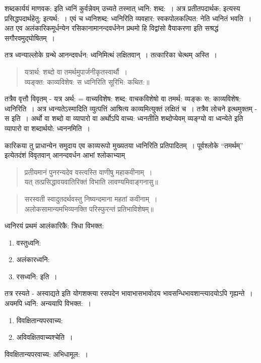 {शब्दकार्ययं माणवक: इति ध्वनिं कुर्वन्नेवम् उच्यते तस्मात् ध्वनि: शब्द:~। अत्र प्रतीतपदार्थक: इत्यस्य प्रसिद्धपदार्थहेतु: इत्यर्थ:~। एवं च ध्वनिशब्द: ध्वनिरिति व्यवहार: स्वकपोलकल्पित: नेति ध्वनितं भवति~। अत एव अलंकारिकमूर्धन्येन रसिकानामानन्दवर्धनेन प्रथमो हि विद्वांसो वैयाकरणा इति सश्रद्धं सगौरवमुद्घोषितम्~। 

तत्र ध्वन्याल्लोके ग्रन्थे आनन्दवर्धन: ध्वनिमित्थं लक्षितवान्~। तत्कारिका चेत्थम् अस्ति~। 
\begin{verse}
यत्रार्थ: शब्दो वा तमर्थमुपार्जनीकृतस्वार्थौ~। \\
व्यङ्क्त: काव्यविशेष: स ध्वनिरिति सूरिभि: कथित:॥
\end{verse}
तत्रैव वृत्तौ विवृतम् - यत्र अर्थ: = वाच्यविशेष: शब्द: वाचकविशेषो वा तमर्थ: व्यङ्कः स: काव्यविशेष: ध्वनिरिति~। अत्र ध्वन्यतेऽस्मादिति व्युत्पत्तिं आश्रित्य काव्यमित्युक्तं लक्षितं च~। तत्रैव लोचने इत्थमुक्तम् - स इति~। अर्थो वा शब्दो वा व्यापारो वा अर्थोऽपि वाच्य: ध्वनतीति शब्दोप्येवम् व्यङ्ग्यो वा ध्वन्येते इति व्यापारो वा शब्दार्थयो: ध्वननमिति~। 

कारिकया तु प्राधान्येन समुदाय एव काव्यरूपो मुख्यतया ध्वनिरिति प्रतिपादितम्~। पूर्वश्लोके “तमर्थम्” इत्येतदंशं विवृतवान् आनन्दवर्धन आभां श्लोकाभ्याम् 
\begin{verse}
प्रतीयमानं पुनरन्यदेव वस्त्वस्ति वाणीषु महाकवीनाम्~। \\
यत् तत्प्रसिद्धावयवातिरिक्तं विभाति लावण्यमिवाङ्गनासु॥
\end{verse}
\begin{verse}
सरस्वती स्वादुतदर्थवस्तु निष्यन्दमाना महतां कवीनाम्~। \\
अलोकसामान्यमभिव्यनक्ति परिस्फुरन्तं प्रतिभाविशेषम्॥
\end{verse}
ध्वनिरयं प्रथमं आलंकारिकै: त्रिधा विभक्त:
\begin{enumerate}
\itemsep=0pt
\item वस्तुध्वनि:
\item अलंकारध्वनि:
\item रसध्वनि: इति~। 
\end{enumerate}

तत्र रस्यते - अस्वाद्यते इति योगशक्त्या रसपदेन भावाभासभावोदय भावसन्धिभाव\-शान्त्यादयोऽपि गृह्यन्ते~। अयमपि ध्वनि: अन्ययापि विभक्त:~। 
\begin{enumerate}
\itemsep=0pt
\item विवक्षितान्यपरवाच्य:
\item अविवक्षितवाच्यश्चेति~। 
\end{enumerate}
विवक्षितान्यपरवाच्य: अभिधामूल:~। 

}
